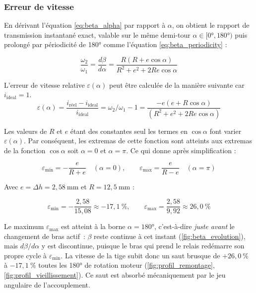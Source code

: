 \subsubsection{Erreur de vitesse}

En dérivant l'équation \eqref{eq:beta_alpha} par rapport à $\alpha$, on obtient le
rapport de transmission instantané exact, valable sur le même demi-tour
$\alpha\in[0°,180°)$ puis prolongé par périodicité de 180° comme
l'équation \eqref{eq:beta_periodicity} :

\begin{equation}
  \frac{\omega_2}{\omega_1} = \frac{d\beta}{d\alpha}
  = \frac{R(R+e\cos\alpha)}{R^2+e^2+2Re\cos\alpha}
  \label{eq:omega_ratio}
\end{equation}

L'erreur de vitesse relative $\varepsilon(\alpha)$ peut être calculée de la manière suivante car $i_{\text{ideal}}=1$.
\begin{equation}
  \varepsilon(\alpha) =\frac{i_{\text{réel}}-i_{\text{ideal}}}{i_{\text{ideal}}}= \omega_2/\omega_1-1=\frac{-e(e+R\cos\alpha)}{(R^2+e^2+2Re\cos\alpha)}
\end{equation}

Les valeurs de $R$ et $e$ étant des constantes seul les termes en $\cos\alpha$ font varier $\varepsilon(\alpha)$. Par conséquent, les extremas de cette fonction sont atteints aux extremas de la fonction $\cos\alpha$ soit $\alpha=0$ et $\alpha=\pi$. Ce qui donne après simplification :

\begin{equation}
  \varepsilon_{\text{min}} = -\frac{e}{R+e} \quad (\alpha=0), \qquad
  \varepsilon_{\text{max}} = \frac{e}{R-e} \quad (\alpha=\pi)
  \label{eq:eps_bounds}
\end{equation}

Avec $e = \Delta h = 2{,}58\ \text{mm}$ et $R=12{,}5\ \text{mm}$ :

\begin{equation}
  \varepsilon_{\text{min}} = -\frac{2{,}58}{15{,}08} \approx -17{,}1\ \%, \qquad
  \varepsilon_{\text{max}} = \frac{2{,}58}{9{,}92} \approx 26{,}0\ \%
  \label{eq:eps_bounds_calc}
\end{equation}

Le maximum $\varepsilon_{\text{max}}$ est atteint à la borne $\alpha=180°$,
c'est-à-dire \emph{juste avant} le changement de bras actif~: $\beta$ reste
continue à cet instant (\autoref{fig:beta_evolution}), mais $d\beta/d\alpha$
y est discontinue, puisque le bras qui prend le relais redémarre son propre
cycle à $\varepsilon_{\text{min}}$. La vitesse de la tige subit donc un saut
brusque de $+26{,}0\ \%$ à $-17{,}1\ \%$ toutes les 180° de rotation moteur
(\autoref{fig:profil_remontage}, \autoref{fig:profil_vieillissement}). Ce saut est absorbé mécaniquement par le jeu angulaire de
l'accouplement.

